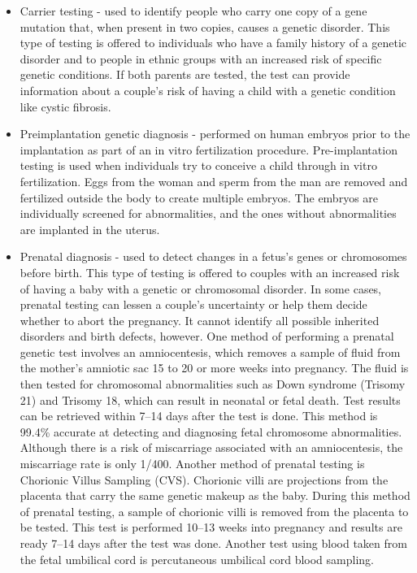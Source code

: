 \begin{itemize}
\item
  Carrier testing - used to identify people who carry one copy of a gene mutation that, when present in two copies, causes a genetic disorder. This type of testing is offered to individuals who have a family history of a genetic disorder and to people in ethnic groups with an increased risk of specific genetic conditions. If both parents are tested, the test can provide information about a couple's risk of having a child with a genetic condition like cystic fibrosis.
\item
  Preimplantation genetic diagnosis - performed on human embryos prior to the implantation as part of an in vitro fertilization procedure. Pre-implantation testing is used when individuals try to conceive a child through in vitro fertilization. Eggs from the woman and sperm from the man are removed and fertilized outside the body to create multiple embryos. The embryos are individually screened for abnormalities, and the ones without abnormalities are implanted in the uterus.
\item
  Prenatal diagnosis - used to detect changes in a fetus's genes or chromosomes before birth. This type of testing is offered to couples with an increased risk of having a baby with a genetic or chromosomal disorder. In some cases, prenatal testing can lessen a couple's uncertainty or help them decide whether to abort the pregnancy. It cannot identify all possible inherited disorders and birth defects, however. One method of performing a prenatal genetic test involves an amniocentesis, which removes a sample of fluid from the mother's amniotic sac 15 to 20 or more weeks into pregnancy. The fluid is then tested for chromosomal abnormalities such as Down syndrome (Trisomy 21) and Trisomy 18, which can result in neonatal or fetal death. Test results can be retrieved within 7--14 days after the test is done. This method is 99.4\% accurate at detecting and diagnosing fetal chromosome abnormalities. Although there is a risk of miscarriage associated with an amniocentesis, the miscarriage rate is only 1/400. Another method of prenatal testing is Chorionic Villus Sampling (CVS). Chorionic villi are projections from the placenta that carry the same genetic makeup as the baby. During this method of prenatal testing, a sample of chorionic villi is removed from the placenta to be tested. This test is performed 10--13 weeks into pregnancy and results are ready 7--14 days after the test was done. Another test using blood taken from the fetal umbilical cord is percutaneous umbilical cord blood sampling.

\end{itemize}
